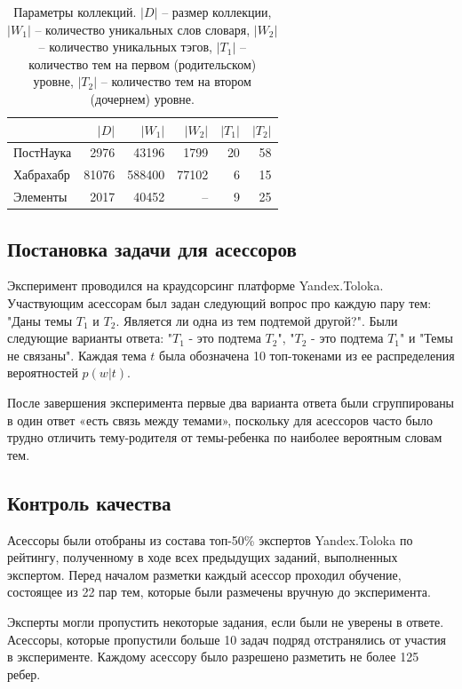 \begin{table}[h!]
\centering
\begin{tabular}{l|r|r|r|r|r}
& $|D|$ & $|W_1|$ & $|W_2|$ & $|T_1|$ & $|T_2|$ \\
\hline
ПостНаука & 2976  & 43196  & 1799 & 20 & 58 \\
\hline
Хабрахабр & 81076 & 588400 & 77102 & 6 & 15 \\
\hline
Элементы & 2017  & 40452  & -- & 9 & 25 \\
\end{tabular}
\caption{\label{table:tm_datasets}Параметры коллекций. $|D|$ -- размер коллекции, $|W_1|$ -- количество уникальных слов словаря, $|W_2|$ -- количество уникальных тэгов, $|T_1|$ -- количество тем на первом (родительском) уровне, $|T_2|$ -- количество тем на втором (дочернем) уровне.}
\end{table}

\subsection{Постановка задачи для асессоров}

Эксперимент проводился на краудсорсинг
платформе Yandex.Toloka. Участвующим асессорам был задан следующий вопрос про каждую пару тем: "Даны темы $T_1$ и $T_2$. Является ли одна из тем подтемой другой?". Были следующие варианты ответа: "$T_1$ - это подтема $T_2$", "$T_2$ - это подтема $T_1$" и "Темы не связаны". Каждая тема $t$ была обозначена 10 топ-токенами из ее распределения вероятностей $p(w|t)$.

После завершения эксперимента первые два варианта ответа были сгруппированы в один ответ «есть связь между темами», поскольку для асессоров часто было трудно отличить тему-родителя от темы-ребенка по наиболее вероятным словам тем. 

\subsection{Контроль качества}
Асессоры были отобраны из состава топ-50\% экспертов Yandex.Toloka по рейтингу, полученному в ходе всех предыдущих заданий, выполненных
экспертом. Перед началом разметки каждый асессор проходил обучение, состоящее из 22 пар тем, которые были размечены вручную до эксперимента.

Эксперты могли пропустить некоторые задания, если были не уверены в ответе. Асессоры, которые пропустили больше 10 задач подряд отстранялись от участия в эксперименте. Каждому асессору было разрешено разметить не более 125 ребер. 

